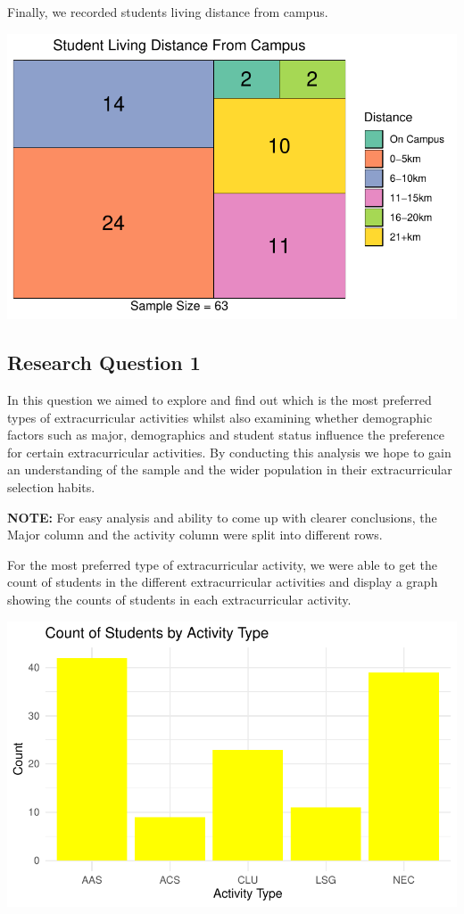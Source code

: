 \documentclass[
  letterpaper,
  DIV=11,
  numbers=noendperiod]{scrartcl}
\begin{document}
Finally, we recorded students living distance from campus.

\includegraphics{technical_report_files/figure-pdf/p5-1.pdf}

\subsection{Research Question 1}\label{research-question-1}

In this question we aimed to explore and find out which is the most
preferred types of extracurricular activities whilst also examining
whether demographic factors such as major, demographics and student
status influence the preference for certain extracurricular activities.
By conducting this analysis we hope to gain an understanding of the
sample and the wider population in their extracurricular selection
habits.

\textbf{NOTE:} For easy analysis and ability to come up with clearer
conclusions, the Major column and the activity column were split into
different rows.

For the most preferred type of extracurricular activity, we were able to
get the count of students in the different extracurricular activities
and display a graph showing the counts of students in each
extracurricular activity.

\includegraphics{technical_report_files/figure-pdf/r1-1.pdf}
\end{document}
